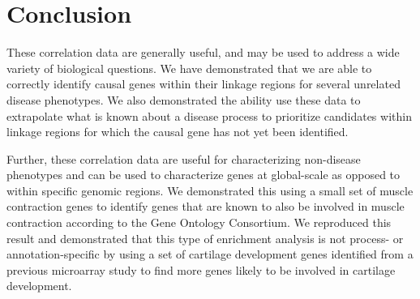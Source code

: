 \documentclass{bioinfo}
\begin{document}
%
%
%
%

\section{Conclusion}

These correlation data are generally useful, and may be used to address a wide
variety of biological questions.  We have demonstrated that we are able to
correctly identify causal genes within their linkage regions for several
unrelated disease phenotypes.  We also demonstrated the ability use these data
to extrapolate what is known about a disease process to prioritize candidates
within linkage regions for which the causal gene has not yet been identified.

Further, these correlation data are useful for characterizing non-disease
phenotypes and can be used to characterize genes at global-scale as opposed to
within specific genomic regions.  We demonstrated this using a small set of
muscle contraction genes to identify genes that are known to also be involved
in muscle contraction according to the Gene Ontology Consortium.  We reproduced
this result and demonstrated that this type of enrichment analysis is not
process- or annotation-specific by using a set of cartilage development genes
identified from a previous microarray study to find more genes likely to be
involved in cartilage development.
\end{document}
